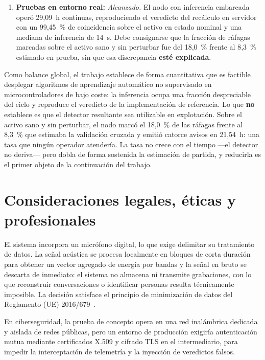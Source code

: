 \begin{enumerate}
        de la variabilidad entre ejemplares. El aflojamiento del anclaje resultó no concluyente.
    \item \textbf{Pruebas en entorno real:} \textit{Alcanzado.} El nodo con inferencia embarcada
        operó \mbox{29,09 h} continuas, reproduciendo el veredicto del recálculo en servidor con un
        \mbox{99,45~\%} de coincidencia sobre el activo en estado nominal y una
        mediana de inferencia de \mbox{14 \textmu s}. Debe consignarse que la fracción de ráfagas
        marcadas sobre el activo sano y sin perturbar fue del \mbox{18,0 \%} frente al
        \mbox{8,3 \%} estimado en prueba, sin que esa discrepancia \textbf{esté explicada}.
\end{enumerate}

Como balance global, el trabajo establece de forma cuantitativa que es factible desplegar
algoritmos de aprendizaje automático no supervisado en microcontroladores de bajo coste: la
inferencia ocupa una fracción despreciable del ciclo y reproduce el veredicto de la
implementación de referencia. Lo que \textbf{no} establece es que el detector resultante sea utilizable en
explotación. Sobre el activo sano y sin perturbar, el nodo marcó el \mbox{18,0 \%} de las
ráfagas frente al \mbox{8,3 \%} que estimaba la validación cruzada y emitió catorce avisos en
\mbox{21,54 h}: una tasa que ningún operador atendería. La tasa no crece con el tiempo —el
detector no deriva— pero dobla de forma sostenida la estimación de partida, y reducirla es el
primer objeto de la continuación del trabajo.

\section{Consideraciones legales, éticas y profesionales}

El sistema incorpora un micrófono digital, lo que exige delimitar su tratamiento de datos. La señal
acústica se procesa localmente en bloques de corta duración para obtener un vector agregado de
energía por bandas y la señal en bruto se descarta de inmediato: el sistema no almacena ni
transmite grabaciones, con lo que reconstruir conversaciones o identificar personas resulta
técnicamente imposible. La decisión satisface el principio de minimización de datos del Reglamento
(UE) 2016/679~\cite{gdpr}.

En ciberseguridad, la prueba de concepto opera en una red inalámbrica dedicada y aislada de redes
públicas, pero un entorno de producción exigiría autenticación mutua mediante certificados X.509 y
cifrado TLS en el intermediario, para impedir la interceptación de telemetría y la inyección de
veredictos falsos.

